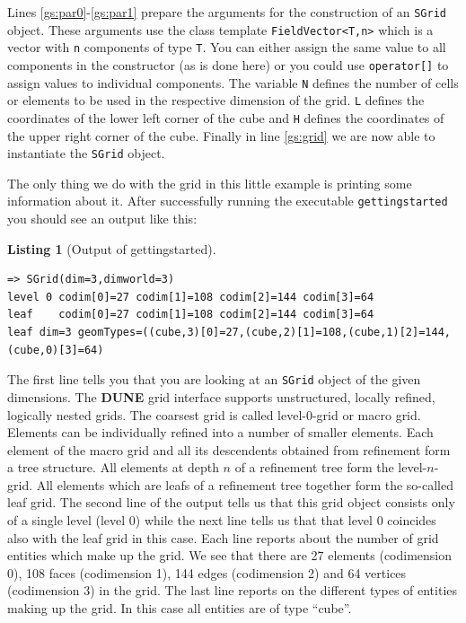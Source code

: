 \documentclass[11pt,a4paper,headinclude,footinclude,DIV16,normalheadings]{scrreprt}
\newcommand{\Dune}{{\sf\bfseries DUNE}}
\newtheorem{lst}{Listing}
\begin{document}
Lines \ref{gs:par0}-\ref{gs:par1} prepare the arguments for the
construction of an \lstinline!SGrid! object. These arguments use the
class template \lstinline!FieldVector<T,n>! which is a vector with
\lstinline!n!  components of type \lstinline!T!. You can either assign
the same value to all components in the constructor (as is done here)
or you could use \lstinline!operator[]! to assign values to individual
components.  The variable \lstinline!N! defines the number of cells or
elements to be used in the respective dimension of the grid.
\lstinline!L! defines the coordinates of the lower left corner of the
cube and \lstinline!H!  defines the coordinates of the upper right corner of the cube.
Finally in line \ref{gs:grid} we are now able to
instantiate the \lstinline!SGrid!  object.

The only thing we do with the grid in this little example is printing
some information about it. After successfully running the executable
\lstinline!gettingstarted! you should see an output like this:

\begin{lst}[Output of gettingstarted] \mbox{}

\begin{lstlisting}[basicstyle=\ttfamily\scriptsize]
=> SGrid(dim=3,dimworld=3)
level 0 codim[0]=27 codim[1]=108 codim[2]=144 codim[3]=64
leaf    codim[0]=27 codim[1]=108 codim[2]=144 codim[3]=64
leaf dim=3 geomTypes=((cube,3)[0]=27,(cube,2)[1]=108,(cube,1)[2]=144,(cube,0)[3]=64)
\end{lstlisting}
\end{lst}

The first line tells you that you are looking at an \lstinline!SGrid!
object of the given dimensions. The \Dune{} grid interface supports
unstructured, locally refined, logically nested grids. The coarsest
grid is called level-0-grid or macro grid. Elements can be
individually refined into a number of smaller elements. Each element
of the macro grid and all its descendents obtained from refinement
form a tree structure. All elements at depth $n$ of a refinement tree
form the level-$n$-grid. All elements which are leafs of a refinement
tree together form the so-called leaf grid. The second line of the
output tells us that this grid object consists only of a single level
(level $0$) while the next line tells us that that level 0 coincides
also with the leaf grid in this case. Each line reports about the
number of grid entities which make up the grid. We see that there are
27 elements (codimension 0), 108 faces (codimension 1), 144 edges
(codimension 2) and 64 vertices (codimension 3) in the grid. The last
line reports on the different types of entities making up the grid. In
this case all entities are of type ``cube''.
\end{document}

